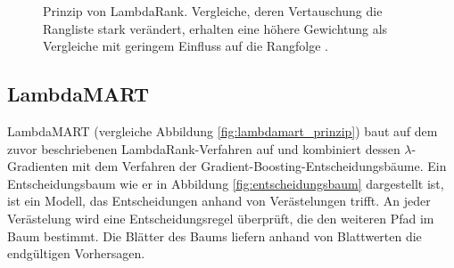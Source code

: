 \begin{figure}[H] 
  \centering 
  \caption{Prinzip von LambdaRank. Vergleiche, deren Vertauschung die Rangliste stark verändert, erhalten eine höhere Gewichtung als Vergleiche mit geringem Einfluss auf die Rangfolge \parencite{Burges2006LambdaRank}.} 
  \label{fig:lambdarank_prinzip} 
\end{figure}

\subsection{LambdaMART}
\label{sec:lambdamart}

LambdaMART (vergleiche Abbildung \ref{fig:lambdamart_prinzip}) baut auf dem zuvor beschriebenen LambdaRank-Verfahren auf und kombiniert dessen $\lambda$-Gradienten mit dem Verfahren der Gradient-Boosting-Entscheidungsbäume. 
Ein Entscheidungsbaum wie er in Abbildung \ref{fig:entscheidungsbaum} dargestellt ist, ist ein Modell, das Entscheidungen anhand von Verästelungen trifft. An jeder Verästelung wird eine Entscheidungsregel überprüft, die den weiteren Pfad im Baum bestimmt. 
Die Blätter des Baums liefern anhand von Blattwerten die endgültigen Vorhersagen.

